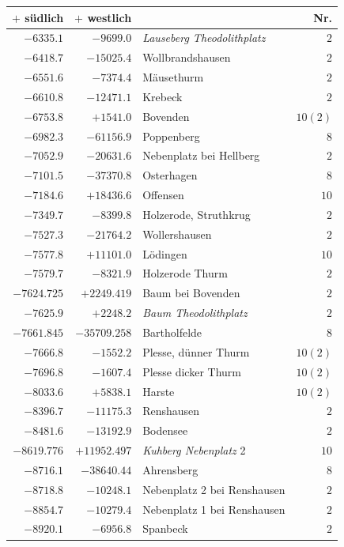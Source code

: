 \begin{center}\begingroup\fontsize{8}{9}\selectfont
\setlength{\tabcolsep}{4pt}
\begin{tabular}{r|r|p{170pt}|r}\hline
\(+\) südlich&\(+\) westlich&&Nr.\\\hline
\(-6335.1\)&\(-9699.0\)&\textit{Lauseberg Theodolithplatz}&\(2\)\\
\(-6418.7\)&\(-15025.4\)&Wollbrandshausen&\(2\)\\
\(-6551.6\)&\(-7374.4\)&Mäusethurm&\(2\)\\
\(-6610.8\)&\(-12471.1\)&Krebeck&\(2\)\\
\(-6753.8\)&\(+1541.0\)&Bovenden&\(10 (2)\)\\
\(-6982.3\)&\(-61156.9\)&Poppenberg&\(8\)\\
\(-7052.9\)&\(-20631.6\)&Nebenplatz bei Hellberg&\(2\)\\
\(-7101.5\)&\(-37370.8\)&Osterhagen&\(8\)\\
\(-7184.6\)&\(+18436.6\)&Offensen&\(10\)\\
\(-7349.7\)&\(-8399.8\)&Holzerode, Struthkrug&\(2\)\\
\(-7527.3\)&\(-21764.2\)&Wollershausen&\(2\)\\
\(-7577.8\)&\(+11101.0\)&Lödingen&\(10\)\\
\(-7579.7\)&\(-8321.9\)&Holzerode Thurm&\(2\)\\
\(-7624.725\)&\(+2249.419\)&Baum bei Bovenden&\(2\)\\
\(-7625.9\)&\(+2248.2\)&\textit{Baum Theodolithplatz}&\(2\)\\
\(-7661.845\)&\(-35709.258\)&Bartholfelde&\(8\)\\
\(-7666.8\)&\(-1552.2\)&Plesse, dünner Thurm&\(10 (2)\)\\
\(-7696.8\)&\(-1607.4\)&Plesse dicker Thurm&\(10 (2)\)\\
\(-8033.6\)&\(+5838.1\)&Harste&\(10 (2)\)\\
\(-8396.7\)&\(-11175.3\)&Renshausen&\(2\)\\
\(-8481.6\)&\(-13192.9\)&Bodensee&\(2\)\\
\(-8619.776\)&\(+11952.497\)&\textit{Kuhberg Nebenplatz} 2&\(10\)\\
\(-8716.1\)&\(-38640.44\)&Ahrensberg&\(8\)\\
\(-8718.8\)&\(-10248.1\)&Nebenplatz 2 bei Renshausen&\(2\)\\
\(-8854.7\)&\(-10279.4\)&Nebenplatz 1 bei Renshausen&\(2\)\\
\(-8920.1\)&\(-6956.8\)&Spanbeck&\(2\)\\

\end{tabular}
\end{center}
